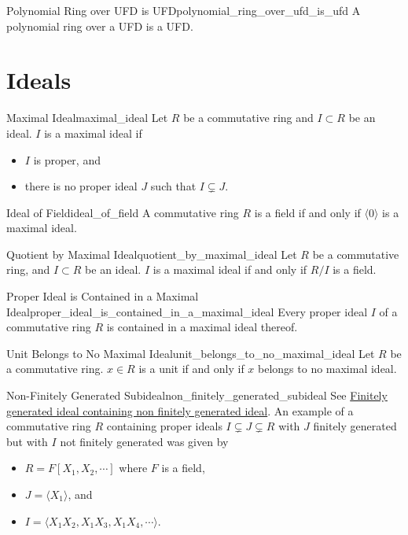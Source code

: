 \documentclass{article}
\begin{document}
\begin{theorem}{Polynomial Ring over UFD is UFD}{polynomial_ring_over_ufd_is_ufd}
    A polynomial ring over a UFD is a UFD.
\end{theorem}

\section{Ideals}

\begin{definition}{Maximal Ideal}{maximal_ideal}
    Let $R$ be a commutative ring and $I\subset R$ be an ideal.
    $I$ is a maximal ideal if
    \begin{itemize}
        \item $I$ is proper, and
        \item there is no proper ideal $J$ such that $I\subsetneq J$.
    \end{itemize}
\end{definition}

\begin{proposition}{Ideal of Field}{ideal_of_field}
    A commutative ring $R$ is a field if and only if $\langle 0 \rangle$ is a maximal ideal.
\end{proposition}

\begin{corollary}{Quotient by Maximal Ideal}{quotient_by_maximal_ideal}
    Let $R$ be a commutative ring, and $I\subset R$ be an ideal.
    $I$ is a maximal ideal if and only if $R/I$ is a field.
\end{corollary}

\begin{theorem}{Proper Ideal is Contained in a Maximal Ideal}{proper_ideal_is_contained_in_a_maximal_ideal}
    Every proper ideal $I$ of a commutative ring $R$ is contained in a maximal ideal thereof.
\end{theorem}

\begin{corollary}{Unit Belongs to No Maximal Ideal}{unit_belongs_to_no_maximal_ideal}
    Let $R$ be a commutative ring.
    $x\in R$ is a unit if and only if $x$ belongs to no maximal ideal.
\end{corollary}

\begin{counterexample}{Non-Finitely Generated Subideal}{non_finitely_generated_subideal}
    See \href{https://math.stackexchange.com/questions/1206194/finitely-generated-ideal-containing-non-finitely-generated-ideal}{Finitely generated ideal containing non finitely generated ideal}.
    An example of a commutative ring $R$ containing proper ideals $I\subsetneq J \subsetneq R$ with $J$ finitely generated but with $I$ not finitely generated was given by
    \begin{itemize}
        \item $R = F[X_1,X_2,\cdots]$ where $F$ is a field,
        \item $J = \langle X_1 \rangle$, and
        \item $I = \langle X_1 X_2, X_1 X_3, X_1 X_4,\cdots \rangle$.
    \end{itemize}
\end{counterexample}
\end{document}
